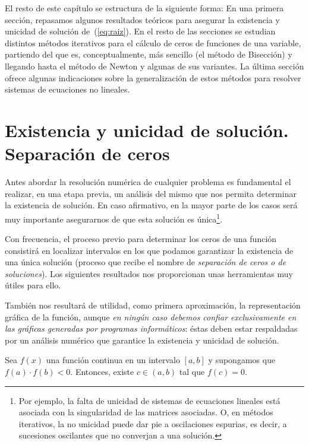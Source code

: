 El resto de este capítulo se estructura de la siguiente forma: En una
primera sección, repasamos algunos resultados teóricos para asegurar
la existencia y unicidad de solución de~(\ref{eq:raiz}). En el resto
de las secciones se estudian distintos métodos iterativos para el
cálculo de ceros de funciones de una variable, partiendo del que es,
conceptualmente, más sencillo (el método de Bisección) y llegando
hasta el método de Newton y algunas de sus variantes.  La última
sección ofrece algunas indicaciones sobre la generalización de estos
métodos para resolver sistemas de ecuaciones no lineales.

\section{Existencia y unicidad de solución. Separación de ceros}
\label{sec:tema1:exist-y-unic}

Antes abordar la resolución numérica de cualquier problema es
fundamental el realizar, en una etapa previa, un análisis del mismo
que nos permita determinar la existencia de solución. En caso
afirmativo, en la mayor parte de los casos será muy importante
asegurarnos de que esta solución es única\footnote{Por ejemplo,
  la falta de unicidad de sistemas de ecuaciones lineales está
  asociada con la singularidad de las matrices asociadas. O, en
  métodos iterativos, la no unicidad puede dar pie a
  oscilaciones espurias, es decir, a sucesiones oscilantes que no
  converjan a una solución.}.

Con frecuencia, el proceso previo para determinar los ceros de una
función consistirá en localizar intervalos en los que podamos
garantizar la existencia de una única solución (proceso que recibe el
nombre de \textit{separación de ceros o de soluciones}). Los
siguientes resultados nos proporcionan unas herramientas muy útiles
para ello.

También nos resultará de utilidad, como primera aproximación, la
representación gráfica de la función, aunque \textit{en ningún caso
  debemos confiar exclusivamente en las gráficas generadas por
  programas informáticos}: éstas deben estar respaldadas por un
análisis numérico que garantice la existencia y unicidad de solución.

\begin{theorem}[Bolzano]
  \label{thm:bolzano}
  Sea $f(x)$ una función continua en un intervalo $[a, b]$ y
  supongamos que $f (a)\cdot f (b) < 0$.  Entonces, existe
  $c\in(a, b)$ tal que $f (c) = 0$.
\end{theorem}

